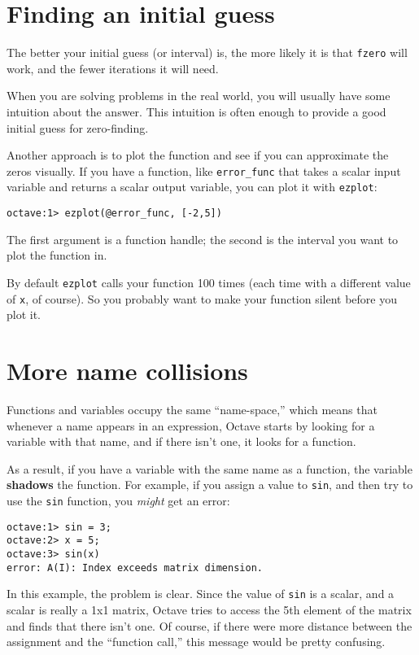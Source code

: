 \section{Finding an initial guess}

The better your initial guess (or interval) is, the more likely
it is that {\tt fzero} will work, and the fewer iterations it will
need.

When you are solving problems in the real world, you will usually
have some intuition about the answer. This intuition is often enough
to provide a good initial guess for zero-finding.

Another approach is to plot the function and see if you can
approximate the zeros visually. If you have a function, like
{\tt error\_func} that takes a scalar input variable and returns
a scalar output variable, you can plot it with {\tt ezplot}:

\begin{verbatim}
octave:1> ezplot(@error_func, [-2,5])
\end{verbatim}

The first argument is a function handle; the second is the 
interval you want to plot the function in.

By default {\tt ezplot} calls your function 100 times (each time
with a different value of {\tt x}, of course). So you probably want
to make your function silent before you plot it.

\section{More name collisions}

Functions and variables occupy the same ``name-space,'' which means
that whenever a name appears in an expression, Octave starts by looking
for a variable with that name, and if there isn't one, it looks for
a function.

As a result, if you have a variable with the same name as a function,
the variable {\bf shadows} the function. For example, if you assign
a value to {\tt sin}, and then try to use the {\tt sin} function, you
{\em might} get an error:

\begin{verbatim}
octave:1> sin = 3;
octave:2> x = 5;
octave:3> sin(x)
error: A(I): Index exceeds matrix dimension.
\end{verbatim}

In this example, the problem is clear. Since the value of {\tt sin}
is a scalar, and a scalar is really a 1x1 matrix, Octave tries to
access the 5th element of the matrix and finds that there isn't one.
Of course, if there were more distance between the assignment
and the ``function call,'' this message would be pretty confusing.

